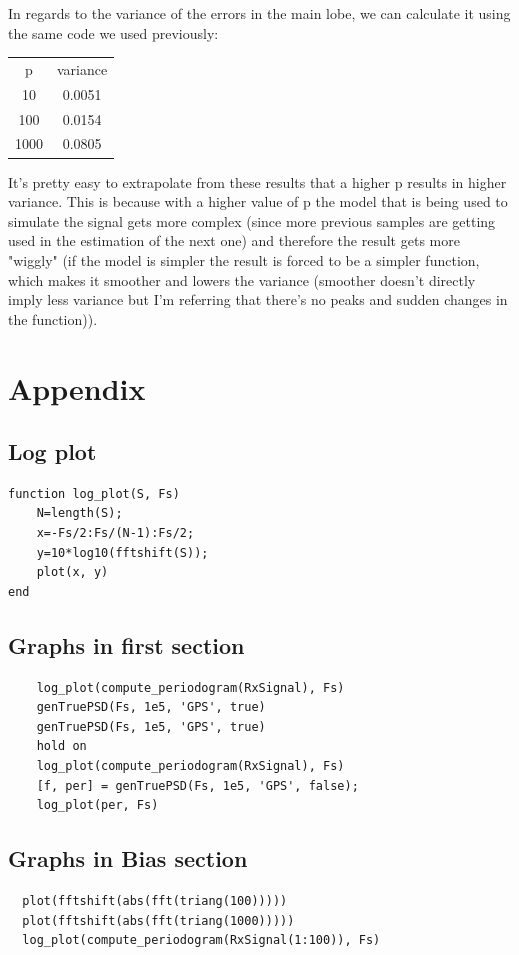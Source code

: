 \documentclass[conference,9pt]{IEEEtran}
\begin{document}
In regards to the variance of the errors in the main lobe, we can calculate it using the same code we used previously:

\begin{center}
  \begin{tabular}{ c c }
   p & variance \\
   10 &  0.0051 \\
   100 &  0.0154 \\
   1000 & 0.0805    
  \end{tabular}
\end{center}

It's pretty easy to extrapolate from these results that a higher p results in higher variance. This is because with a higher value of p the model that is being used to simulate the signal gets more complex (since more previous samples are getting used in the estimation of the next one) and therefore the result gets more "wiggly" (if the model is simpler the result is forced to be a simpler function, which makes it smoother and lowers the variance (smoother doesn't directly imply less variance but I'm referring that there's no peaks and sudden changes in the function)).

\section{Appendix}
\subsection{Log plot}
\begin{verbatim}
function log_plot(S, Fs)
    N=length(S);
    x=-Fs/2:Fs/(N-1):Fs/2;
    y=10*log10(fftshift(S));
    plot(x, y)
end
\end{verbatim}

\subsection{Graphs in first section}
\begin{verbatim}
    log_plot(compute_periodogram(RxSignal), Fs)
    genTruePSD(Fs, 1e5, 'GPS', true)
    genTruePSD(Fs, 1e5, 'GPS', true)
    hold on
    log_plot(compute_periodogram(RxSignal), Fs)
    [f, per] = genTruePSD(Fs, 1e5, 'GPS', false);
    log_plot(per, Fs)
\end{verbatim}

\subsection{Graphs in Bias section}
\begin{verbatim}
  plot(fftshift(abs(fft(triang(100)))))
  plot(fftshift(abs(fft(triang(1000)))))
  log_plot(compute_periodogram(RxSignal(1:100)), Fs)
\end{verbatim}
\end{document}
